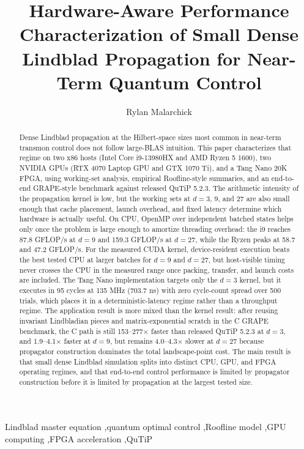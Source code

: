 \documentclass[3p,times,twocolumn]{elsarticle}
\begin{document}
\begin{frontmatter}

\title{Hardware-Aware Performance Characterization of Small Dense Lindblad Propagation for Near-Term Quantum Control}

\author[erau]{Rylan Malarchick}


\begin{abstract}
Dense Lindblad propagation at the Hilbert-space sizes most common in
near-term transmon control does not follow large-BLAS intuition. This paper
characterizes that regime on two x86 hosts (Intel Core i9-13980HX and AMD
Ryzen 5 1600), two NVIDIA GPUs (RTX 4070 Laptop GPU and GTX 1070 Ti), and a
Tang Nano 20K FPGA, using working-set analysis, empirical Roofline-style
summaries, and an end-to-end GRAPE-style benchmark against released QuTiP
5.2.3. The arithmetic intensity of the propagation kernel is low, but the
working sets at $d=3$, $9$, and $27$ are also small enough that cache
placement, launch overhead, and fixed latency determine which hardware is
actually useful. On CPU, OpenMP over independent batched states helps only
once the problem is large enough to amortize threading overhead: the i9
reaches 87.8 GFLOP/s at $d=9$ and 159.3 GFLOP/s at $d=27$, while the Ryzen
peaks at 58.7 and 47.2 GFLOP/s. For the measured CUDA kernel,
device-resident execution beats the best tested CPU at larger batches for
$d=9$ and $d=27$, but host-visible timing never crosses the CPU in the
measured range once packing, transfer, and launch costs are included. The
Tang Nano implementation targets only the $d=3$ kernel, but it executes in
95 cycles at 135 MHz (703.7 ns) with zero cycle-count spread over 500
trials, which places it in a deterministic-latency regime rather than a
throughput regime. The application result is more mixed than the kernel
result: after reusing invariant Lindbladian pieces and matrix-exponential
scratch in the C GRAPE benchmark, the C path is still 153--277$\times$
faster than released QuTiP 5.2.3 at $d=3$, and 1.9--4.1$\times$ faster at
$d=9$, but remains 4.0--4.3$\times$ slower at $d=27$ because propagator
construction dominates the total landscape-point cost. The main result is
that small dense Lindblad simulation splits into distinct CPU, GPU, and FPGA
operating regimes, and that end-to-end control performance is limited by
propagator construction before it is limited by propagation at the largest
tested size.
\end{abstract}

\begin{keyword}
Lindblad master equation \sep quantum optimal control \sep Roofline model
\sep GPU computing \sep FPGA acceleration \sep QuTiP
\end{keyword}

\end{frontmatter}
\end{document}
